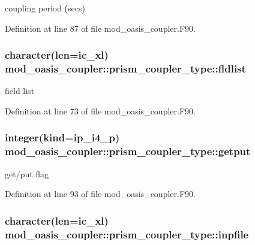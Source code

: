 coupling period (secs) 



Definition at line 87 of file mod\+\_\+oasis\+\_\+coupler.\+F90.

\hypertarget{structmod__oasis__coupler_1_1prism__coupler__type_a559f90a9b77db151a2a39802a66ddf2b}{
\subsubsection[{fldlist}]{\setlength{\rightskip}{0pt plus 5cm}character(len=ic\+\_\+xl) mod\+\_\+oasis\+\_\+coupler\+::prism\+\_\+coupler\+\_\+type\+::fldlist\hspace{0.3cm}{\ttfamily [private]}}}\label{structmod__oasis__coupler_1_1prism__coupler__type_a559f90a9b77db151a2a39802a66ddf2b}


field list 



Definition at line 73 of file mod\+\_\+oasis\+\_\+coupler.\+F90.

\hypertarget{structmod__oasis__coupler_1_1prism__coupler__type_a72f8ada57213a9c0e6ab85742c521f86}{
\subsubsection[{getput}]{\setlength{\rightskip}{0pt plus 5cm}integer(kind=ip\+\_\+i4\+\_\+p) mod\+\_\+oasis\+\_\+coupler\+::prism\+\_\+coupler\+\_\+type\+::getput\hspace{0.3cm}{\ttfamily [private]}}}\label{structmod__oasis__coupler_1_1prism__coupler__type_a72f8ada57213a9c0e6ab85742c521f86}


get/put flag 



Definition at line 93 of file mod\+\_\+oasis\+\_\+coupler.\+F90.

\hypertarget{structmod__oasis__coupler_1_1prism__coupler__type_a0ecb3c23d7b761aa9bfad0fbb59e40d3}{
\subsubsection[{inpfile}]{\setlength{\rightskip}{0pt plus 5cm}character(len=ic\+\_\+xl) mod\+\_\+oasis\+\_\+coupler\+::prism\+\_\+coupler\+\_\+type\+::inpfile\hspace{0.3cm}{\ttfamily [private]}}}\label{structmod__oasis__coupler_1_1prism__coupler__type_a0ecb3c23d7b761aa9bfad0fbb59e40d3}


